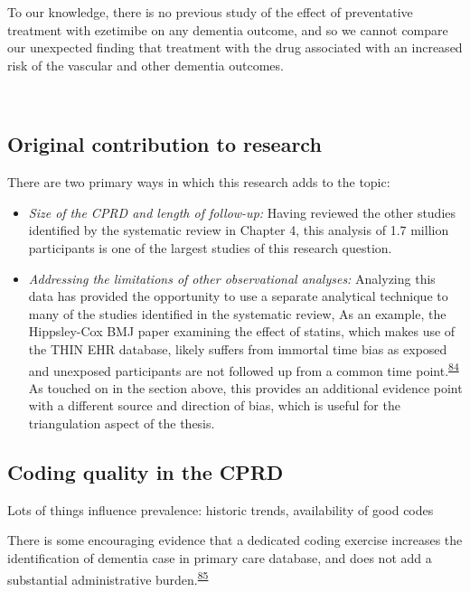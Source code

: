 \documentclass[a4paper, twoside]{templates/ociamthesis}
\providecommand{\tightlist}{%
  \setlength{\itemsep}{0pt}\setlength{\parskip}{0pt}}
\begin{document}
To our knowledge, there is no previous study of the effect of preventative treatment with ezetimibe on any dementia outcome, and so we cannot compare our unexpected finding that treatment with the drug associated with an increased risk of the vascular and other dementia outcomes.

~

\hypertarget{original-contribution-to-research-1}{%
\subsection{Original contribution to research}\label{original-contribution-to-research-1}}

There are two primary ways in which this research adds to the topic:

\begin{itemize}
\tightlist
\item
  \emph{Size of the CPRD and length of follow-up:} Having reviewed the other studies identified by the systematic review in Chapter 4, this analysis of 1.7 million participants is one of the largest studies of this research question.
\item
  \emph{Addressing the limitations of other observational analyses:} Analyzing this data has provided the opportunity to use a separate analytical technique to many of the studies identified in the systematic review, As an example, the Hippsley-Cox BMJ paper examining the effect of statins, which makes use of the THIN EHR database, likely suffers from immortal time bias as exposed and unexposed participants are not followed up from a common time point.\textsuperscript{\protect\hyperlink{ref-hippisley-cox2010}{84}} As touched on in the section above, this provides an additional evidence point with a different source and direction of bias, which is useful for the triangulation aspect of the thesis.
\end{itemize}

\hypertarget{coding-quality-in-the-cprd}{%
\subsection{Coding quality in the CPRD}\label{coding-quality-in-the-cprd}}

Lots of things influence prevalence: historic trends, availability of good codes

There is some encouraging evidence that a dedicated coding exercise increases the identification of dementia case in primary care database, and does not add a substantial administrative burden.\textsuperscript{\protect\hyperlink{ref-russell2013}{85}}
\end{document}

